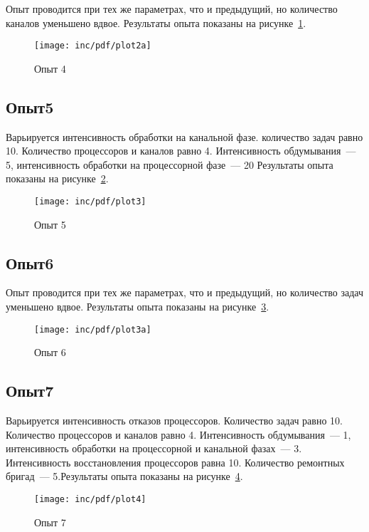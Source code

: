 Опыт проводится при тех же параметрах, что и предыдущий, но количество каналов уменьшено вдвое. Результаты опыта показаны на рисунке~\ref{fig:plot2a}.

\begin{figure}[ht!]
  \centering
  \texttt{[image: inc/pdf/plot2a]}
  \caption{Опыт 4}
  \label{fig:plot2a}
\end{figure}

\subsection*{Опыт5}

Варьируется интенсивность обработки на канальной фазе. количество задач равно 10. Количество процессоров и каналов равно 4. Интенсивность обдумывания~--- 5, интенсивность обработки на процессорной фазе~--- 20 Результаты опыта показаны на рисунке~\ref{fig:plot3}.

\begin{figure}[ht!]
  \centering
  \texttt{[image: inc/pdf/plot3]}
  \caption{Опыт 5}
  \label{fig:plot3}
\end{figure}

\subsection*{Опыт6}

Опыт проводится при тех же параметрах, что и предыдущий, но количество задач уменьшено вдвое. Результаты опыта показаны на рисунке~\ref{fig:plot3a}.

\begin{figure}[ht!]
  \centering
  \texttt{[image: inc/pdf/plot3a]}
  \caption{Опыт 6}
  \label{fig:plot3a}
\end{figure}

\subsection*{Опыт7}

Варьируется интенсивность отказов процессоров. Количество задач равно 10. Количество процессоров и каналов равно 4. Интенсивность обдумывания~--- 1, интенсивность обработки на процессорной  и канальной фазах~--- 3. Интенсивность восстановления процессоров равна 10. Количество ремонтных бригад~--- 5.Результаты опыта показаны на рисунке~\ref{fig:plot4}.


\begin{figure}[ht!]
  \centering
  \texttt{[image: inc/pdf/plot4]}
  \caption{Опыт 7}
  \label{fig:plot4}
\end{figure}

